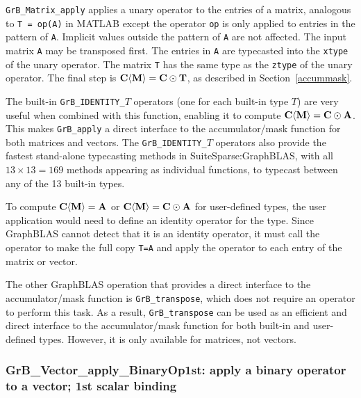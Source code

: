 \documentclass[12pt]{article}
\begin{document}
\verb'GrB_Matrix_apply'
applies a unary operator to the entries of a matrix, analogous to
\verb'T = op(A)'  in MATLAB except the operator \verb'op' is only applied to
entries in the pattern of \verb'A'.  Implicit values outside the pattern of
\verb'A' are not affected.  The input matrix \verb'A' may be transposed first.
The entries in \verb'A' are typecasted into the \verb'xtype' of the unary
operator.  The matrix \verb'T' has the same type as the \verb'ztype' of the
unary operator.  The final step is ${\bf C \langle M \rangle  = C \odot T}$, as
described in Section~\ref{accummask}.

The built-in \verb'GrB_IDENTITY_'$T$ operators (one for each built-in type $T$)
are very useful when combined with this function, enabling it to compute ${\bf
C \langle M \rangle  = C \odot A}$.  This makes \verb'GrB_apply' a direct
interface to the accumulator/mask function for both matrices and vectors.
The \verb'GrB_IDENTITY_'$T$ operators also provide the fastest stand-alone
typecasting methods in SuiteSparse:GraphBLAS, with all $13 \times 13=169$
methods appearing as individual functions, to typecast between any of the 13
built-in types.

To compute ${\bf C \langle M \rangle = A}$ or ${\bf C \langle M \rangle = C
\odot A}$ for user-defined types, the user application would need to define an
identity operator for the type.  Since GraphBLAS cannot detect that it is an
identity operator, it must call the operator to make the full copy \verb'T=A'
and apply the operator to each entry of the matrix or vector.

The other GraphBLAS operation that provides a direct interface to the
accumulator/mask function is \verb'GrB_transpose', which does not require an
operator to perform this task.  As a result, \verb'GrB_transpose' can be used
as an efficient and direct interface to the accumulator/mask function for
both built-in and user-defined types.  However, it is only available for
matrices, not vectors.

\newpage
\subsubsection{{\sf GrB\_Vector\_apply\_BinaryOp1st:} apply a binary operator to a vector; 1st scalar binding}
\label{vector_apply1st}
\end{document}
